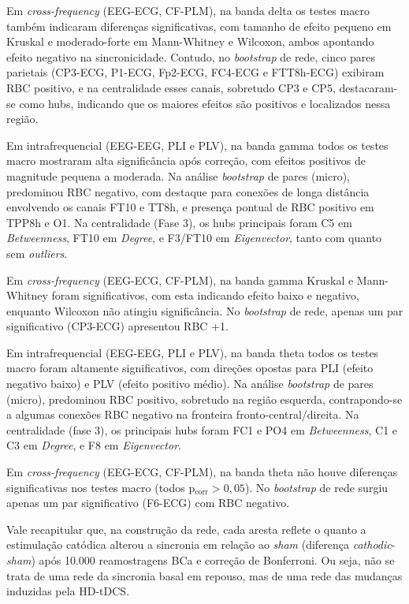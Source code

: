 Em \textit{cross-frequency} (EEG-ECG, CF-PLM), na banda delta os testes macro também indicaram diferenças significativas, com tamanho de efeito pequeno em Kruskal e moderado-forte em Mann-Whitney e Wilcoxon, ambos apontando efeito negativo na sincronicidade. Contudo, no \textit{bootstrap} de rede, cinco pares parietais (CP3-ECG, P1-ECG, Fp2-ECG, FC4-ECG e FTT8h-ECG) exibiram RBC positivo, e na centralidade esses canais, sobretudo CP3 e CP5, destacaram-se como hubs, indicando que os maiores efeitos são positivos e localizados nessa região.

Em intrafrequencial (EEG-EEG, PLI e PLV), na banda gamma todos os testes macro mostraram alta significância após correção, com efeitos positivos de magnitude pequena a moderada. Na análise \textit{bootstrap} de pares (micro), predominou RBC negativo, com destaque para conexões de longa distância envolvendo os canais FT10 e TT8h, e presença pontual de RBC positivo em TPP8h e O1.  
Na centralidade (Fase 3), os hubs principais foram C5 em \textit{Betweenness}, FT10 em \textit{Degree}, e F3/FT10 em \textit{Eigenvector}, tanto com quanto sem \textit{outliers}.

Em \textit{cross-frequency} (EEG-ECG, CF-PLM), na banda gamma Kruskal e Mann-Whitney foram significativos, com esta indicando efeito baixo e negativo, enquanto Wilcoxon não atingiu significância. No \textit{bootstrap} de rede, apenas um par significativo (CP3-ECG) apresentou RBC +1.

Em intrafrequencial (EEG-EEG, PLI e PLV), na banda theta todos os testes macro foram altamente significativos, com direções opostas para PLI (efeito negativo baixo) e PLV (efeito positivo médio). Na análise \textit{bootstrap} de pares (micro), predominou RBC positivo, sobretudo na região esquerda, contrapondo-se a algumas conexões RBC negativo na fronteira fronto-central/direita. Na centralidade (fase 3), os principais hubs foram FC1 e PO4 em \textit{Betweenness}, C1 e C3 em \textit{Degree}, e F8 em \textit{Eigenvector}.

Em \textit{cross-frequency} (EEG-ECG, CF-PLM), na banda theta não houve diferenças significativas nos testes macro (todos p$_{\mathrm{corr}}>0{,}05$). No \textit{bootstrap} de rede surgiu apenas um par significativo (F6-ECG) com RBC negativo.

Vale recapitular que, na construção da rede, cada aresta reflete o quanto a estimulação catódica alterou a sincronia em relação ao \textit{sham} (diferença \textit{cathodic}-\textit{sham}) após 10.000 reamostragens BCa e correção de Bonferroni. Ou seja, não se trata de uma rede da sincronia basal em repouso, mas de uma rede das mudanças induzidas pela HD-tDCS.

